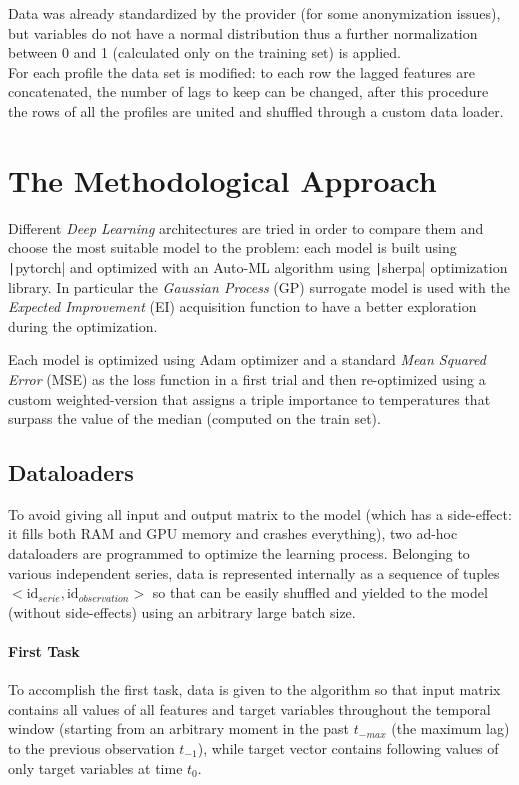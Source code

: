Data was already standardized by the provider (for some anonymization issues), but variables do not have a normal distribution thus a further normalization between 0 and 1 (calculated only on the training set) is applied.\\
For each profile the data set is modified: to each row the lagged features are concatenated, the number of lags to keep can be changed, after this procedure the rows of all the profiles are united and shuffled through a custom data loader.

\section{The Methodological Approach}
Different \textit{Deep Learning} architectures are tried in order to compare them and choose the most suitable model to the problem: each model is built using \texttt|pytorch| and optimized with an Auto-ML algorithm using \texttt|sherpa| optimization library.
In particular the \textit{Gaussian Process} (GP) surrogate model is used with the \textit{Expected Improvement} (EI) acquisition function to have a better exploration during the optimization.

Each model is optimized using Adam optimizer and a standard \textit{Mean Squared Error} (MSE) as the loss function in a first trial and then re-optimized using a custom weighted-version that assigns a triple importance to temperatures that surpass the value of the median (computed on the train set).

\subsection{Dataloaders}
To avoid giving all input and output matrix to the model (which has a side-effect: it fills both RAM and GPU memory and crashes everything), two ad-hoc dataloaders are programmed to optimize the learning process.
Belonging to various independent series, data is represented internally as a sequence of tuples $<\text{id}_{serie}, \text{id}_{observation}>$ so that can be easily shuffled and yielded to the model (without side-effects) using an arbitrary large batch size.

\paragraph{First Task}
To accomplish the first task, data is given to the algorithm so that input matrix contains all values of all features and target variables throughout the temporal window (starting from an arbitrary moment in the past $t_{-max}$ (the maximum lag) to the previous observation $t_{-1}$), while target vector contains following values of only target variables at time $t_0$.

